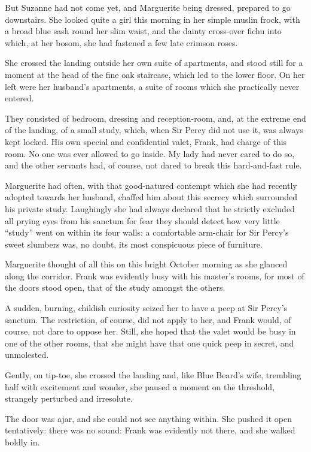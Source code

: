 But Suzanne had not come yet, and Marguerite being dressed, prepared to go downstairs. She looked quite a girl this morning in her simple muslin frock, with a broad blue sash round her slim waist, and the dainty cross-over fichu into which, at her bosom, she had fastened a few late crimson roses.

She crossed the landing outside her own suite of apartments, and stood still for a moment at the head of the fine oak staircase, which led to the lower floor. On her left were her husband's apartments, a suite of rooms which she practically never entered.

They consisted of bedroom, dressing and reception-room, and, at the extreme end of the landing, of a small study, which, when Sir Percy did not use it, was always kept locked. His own special and confidential valet, Frank, had charge of this room. No one was ever allowed to go inside. My lady had never cared to do so, and the other servants had, of course, not dared to break this hard-and-fast rule.

Marguerite had often, with that good-natured contempt which she had recently adopted towards her husband, chaffed him about this secrecy which surrounded his private study. Laughingly she had always declared that he strictly excluded all prying eyes from his sanctum for fear they should detect how very little \enquote{study} went on within its four walls: a comfortable arm-chair for Sir Percy's sweet slumbers was, no doubt, its most conspicuous piece of furniture.

Marguerite thought of all this on this bright October morning as she glanced along the corridor. Frank was evidently busy with his master's rooms, for most of the doors stood open, that of the study amongst the others.

A sudden, burning, childish curiosity seized her to have a peep at Sir Percy's sanctum. The restriction, of course, did not apply to her, and Frank would, of course, not dare to oppose her. Still, she hoped that the valet would be busy in one of the other rooms, that she might have that one quick peep in secret, and unmolested.

Gently, on tip-toe, she crossed the landing and, like Blue Beard's wife, trembling half with excitement and wonder, she paused a moment on the threshold, strangely perturbed and irresolute.

The door was ajar, and she could not see anything within. She pushed it open tentatively: there was no sound: Frank was evidently not there, and she walked boldly in.

